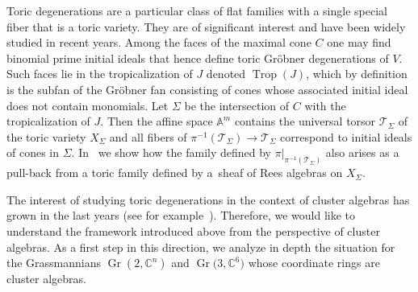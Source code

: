 \documentclass[pdftex]{sigma}%
\numberwithin{equation}{section}
\DeclareMathOperator{\Gr}{Gr}
\DeclareMathOperator{\trop}{Trop}
\begin{document}
Toric degenerations are a particular class of flat families with a single special fiber that is a toric variety.
They are of significant interest and have been widely studied in recent years.
Among the faces of the maximal cone $C$ one may find binomial prime initial ideals that hence define toric Gr\"obner degenerations of $V$.
Such faces lie in the tropicalization of $J$ denoted $\trop(J)$, which by definition is the subfan of the Gr\"obner fan consisting of cones whose associated initial ideal does not contain monomials.
Let $\Sigma$ be the intersection of $C$ with the tropicalization of $J$.
Then the affine space $\mathbb A^m$ contains the universal torsor $\mathcal T_\Sigma$ of the toric variety $X_\Sigma$ and all fibers of $\pi^{-1}(\mathcal T_\Sigma)\to \mathcal T_\Sigma$ correspond to initial ideals of cones in $\Sigma$.
In~ we show how the family defined by $\pi\vert_{\pi^{-1}(\mathcal T_\Sigma)}$ also arises as a pull-back from a toric family defined by a~sheaf of Rees algebras on $X_\Sigma$.

\medskip

The interest of studying toric degenerations in the context of cluster algebras has grown in the last years (see for example~\cite{BFMN,GHKK}).
Therefore, we would like to understand the framework introduced above from the perspective of cluster algebras.
As a first step in this direction, we analyze in depth the situation for the Grassmannians $\Gr(2,\mathbb C^n)$ and $\Gr\big(3,\mathbb C^6\big)$ whose coordinate rings are cluster algebras.
\end{document}
